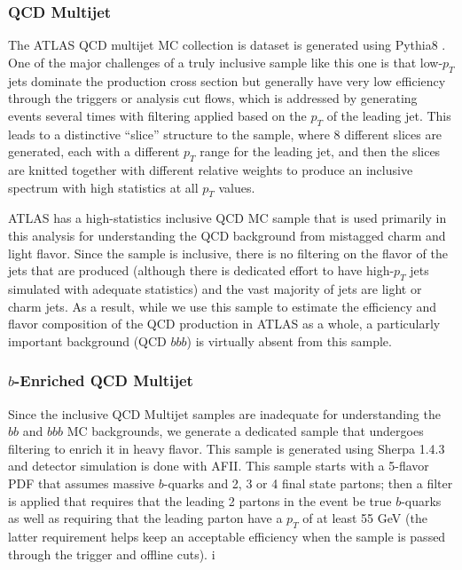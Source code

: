 \subsubsection{QCD Multijet}
The ATLAS QCD multijet MC collection is dataset is generated using Pythia8 \cite{Pythia8}.  One of the major challenges of a truly inclusive sample like this one is that low-$p_T$ jets dominate the production cross section but generally have very low efficiency through the triggers or analysis cut flows, which is addressed by generating events several times with filtering applied based on the $p_T$ of the leading jet.  This leads to a distinctive ``slice'' structure to the sample, where 8 different slices are generated, each with a different $p_T$ range for the leading jet, and then the slices are knitted together with different relative weights to produce an inclusive spectrum with high statistics at all $p_T$ values.  


ATLAS has a high-statistics inclusive QCD MC sample that is used primarily in this analysis for understanding the QCD background from mistagged charm and light flavor.  Since the sample is inclusive, there is no filtering on the flavor of the jets that are produced (although there is dedicated effort to have high-$p_T$ jets simulated with adequate statistics) and the vast majority of jets are light or charm jets.  As a result, while we use this sample to estimate the efficiency and flavor composition of the QCD production in ATLAS as a whole, a particularly important background (QCD $bbb$) is virtually absent from this sample.


\subsubsection{$b$-Enriched QCD Multijet}
Since the inclusive QCD Multijet samples are inadequate for understanding the $bb$ and $bbb$ MC backgrounds, we generate a dedicated sample that undergoes filtering to enrich it in heavy flavor.  This sample is generated using Sherpa 1.4.3 \cite{Sherpa} and detector simulation is done with AFII.  This sample starts with a 5-flavor PDF that assumes massive $b$-quarks and 2, 3 or 4 final state partons; then a filter is applied that requires that the leading 2 partons in the event be true $b$-quarks as well as requiring that the leading parton have a $p_T$ of at least 55 GeV (the latter requirement helps keep an acceptable efficiency when the sample is passed through the trigger and offline cuts).
i

